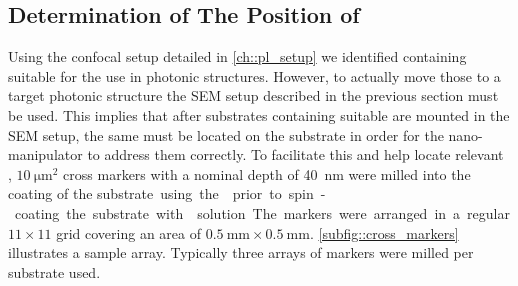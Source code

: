 	\subsection{Determination of The Position of \Nds} \label{subsec::position}

		Using the confocal setup detailed in \autoref{ch::pl_setup} we identified \nds containing \sivs suitable for the use in photonic structures. However, to actually move those \nds to a target photonic structure the SEM setup described in the previous section must be used. This implies that after substrates containing suitable \nds are mounted in the SEM setup, the same \nds must be located on the substrate in order for the nano-manipulator to address them correctly.
		To facilitate this and help locate relevant \nds, $\SI{10}{\micro\meter\squared}$ cross markers with a nominal depth of \SI{40}{\nm} were milled into the \ir coating of the \si substrate using the \fib prior to spin-coating the substrate with \nd solution. The markers were arranged in a regular $11 \times 11$ grid covering an area of $\SI{0.5}{\milli\meter} \times \SI{0.5}{\milli\meter}$. \autoref{subfig::cross_markers} illustrates a sample array. Typically three arrays of markers were milled per substrate used.

